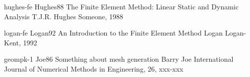 


\begin{acbib}%
 {hughes-fe}%
 {Hughes88}%
 {The Finite Element Method: Linear Static and Dynamic Analysis}%
 {T.J.R. Hughes}%
 {Someone, 1988}%
 {}%
 {}%
\end{acbib}

\begin{acbib}%
 {logan-fe}%
 {Logan92}
 {An Introduction to the Finite Element Method}%
 {Logan}%
 {Logan-Kent, 1992}%
 {}%
 {}%
\end{acbib}

\begin{acbib}%
 {geompk-1}%
 {Joe86}%
 {Something about mesh generation}%
 {Barry Joe}%
 {International Journal of Numerical Methods in Engineering, 26, xxx-xxx}%
 {}%
 {}%
\end{acbib}
